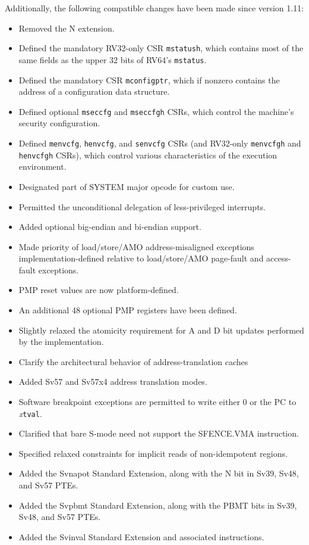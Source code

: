 Additionally, the following compatible changes have been made since version
1.11:
\vspace{-0.2in}
\begin{itemize}
  \parskip 0pt
  \itemsep 1pt
\item Removed the N extension.
\item Defined the mandatory RV32-only CSR {\tt mstatush}, which contains
  most of the same fields as the upper 32 bits of RV64's {\tt mstatus}.
\item Defined the mandatory CSR {\tt mconfigptr}, which if nonzero
  contains the address of a configuration data structure.
\item Defined optional {\tt mseccfg} and {\tt mseccfgh} CSRs, which control
 the machine's security configuration.
\item Defined {\tt menvcfg}, {\tt henvcfg}, and {\tt senvcfg} CSRs
  (and RV32-only {\tt menvcfgh} and {\tt henvcfgh} CSRs),
  which control various characteristics of the execution environment.
\item Designated part of SYSTEM major opcode for custom use.
\item Permitted the unconditional delegation of less-privileged interrupts.
\item Added optional big-endian and bi-endian support.
\item Made priority of load/store/AMO address-misaligned exceptions
  implementation-defined relative to load/store/AMO page-fault
  and access-fault exceptions.
\item PMP reset values are now platform-defined.
\item An additional 48 optional PMP registers have been defined.
\item Slightly relaxed the atomicity requirement for A and D bit updates
  performed by the implementation.
\item Clarify the architectural behavior of address-translation caches
\item Added Sv57 and Sv57x4 address translation modes.
\item Software breakpoint exceptions are permitted to write either 0
  or the PC to {\em x}\/{\tt tval}.
\item Clarified that bare S-mode need not support the SFENCE.VMA instruction.
\item Specified relaxed constraints for implicit reads of non-idempotent
  regions.
\item Added the Svnapot Standard Extension, along with the N bit in
  Sv39, Sv48, and Sv57 PTEs.
\item Added the Svpbmt Standard Extension, along with the PBMT bits in
  Sv39, Sv48, and Sv57 PTEs.
\item Added the Svinval Standard Extension and associated instructions.
\end{itemize}

